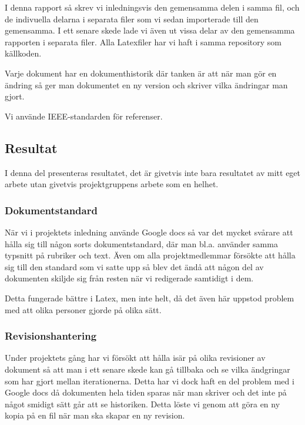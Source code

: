 I denna rapport så skrev vi inledningsvis den gemensamma delen i samma fil, och de indivuella delarna i separata filer som vi sedan importerade till den gemensamma. I ett senare skede lade vi även ut vissa delar av den gemensamma rapporten i separata filer. Alla Latexfiler har vi haft i samma repository som källkoden.

Varje dokument har en dokumenthistorik där tanken är att när man gör en ändring så ger man dokumentet en ny version och skriver vilka ändringar man gjort.

Vi använde IEEE-standarden för referenser.

\subsection{Resultat}
I denna del presenteras resultatet, det är givetvis inte bara resultatet av mitt eget arbete utan givetvis projektgruppens arbete som en helhet.

\subsubsection{Dokumentstandard}
När vi i projektets inledning använde Google docs så var det mycket svårare att hålla sig till någon sorts dokumentstandard, där man bl.a. använder samma typsnitt på rubriker och text. Även om alla projektmedlemmar försökte att hålla sig till den standard som vi satte upp så blev det ändå att någon del av dokumenten skiljde sig från resten när vi redigerade samtidigt i dem.

Detta fungerade bättre i Latex, men inte helt, då det även här uppstod problem med att olika personer gjorde på olika sätt.

\subsubsection{Revisionshantering}
Under projektets gång har vi försökt att hålla isär på olika revisioner av dokument så att man i ett senare skede kan gå tillbaka och se vilka ändgringar som har gjort mellan iterationerna.
Detta har vi dock haft en del problem med i Google docs då dokumenten hela tiden sparas när man skriver och det inte på något smidigt sätt går att se historiken. Detta löste vi genom att göra en ny kopia på en fil när man ska skapar en ny revision.

